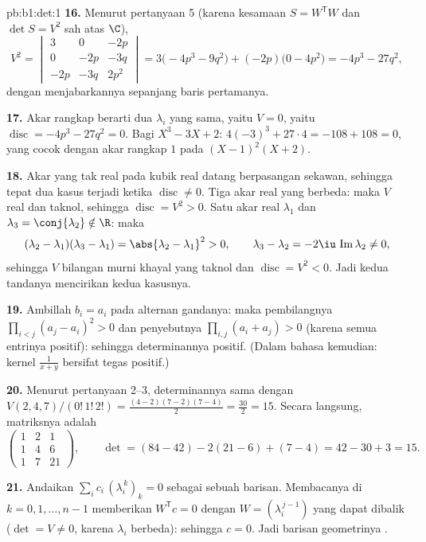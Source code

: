 \begin{solution}{pb:b1:det:1}
\textbf{16.} Menurut pertanyaan 5 (karena kesamaan $S = W^{\mathsf T}W$
dan $\det S = V^2$ sah atas $\C$),
\[
V^2 = \begin{vmatrix}
3 & 0 & -2p\\
0 & -2p & -3q\\
-2p & -3q & 2p^2
\end{vmatrix}
= 3\bigl(-4p^3 - 9q^2\bigr) + (-2p)\bigl(0 - 4p^2\bigr)
= -4p^3 - 27q^2 ,
\]
dengan menjabarkannya sepanjang baris pertamanya.

\textbf{17.} Akar rangkap berarti dua $\lambda_i$ yang sama, yaitu
$V = 0$, yaitu $\operatorname{disc} = -4p^3 - 27q^2 = 0$. Bagi
$X^3 - 3X + 2$: $4(-3)^3 + 27\cdot4 = -108 + 108 = 0$, yang cocok dengan
akar rangkap $1$ pada $(X-1)^2(X+2)$.

\textbf{18.} Akar yang tak real pada kubik real datang berpasangan
sekawan, sehingga tepat dua kasus terjadi ketika $\operatorname{disc} \neq
0$. Tiga akar real yang berbeda: maka $V$ real dan taknol, sehingga
$\operatorname{disc} = V^2 > 0$. Satu akar real $\lambda_1$ dan
$\lambda_3 = \conj{\lambda_2} \notin \R$: maka
\[
(\lambda_2 - \lambda_1)(\lambda_3 - \lambda_1) =
\abs{\lambda_2 - \lambda_1}^2 > 0,
\qquad
\lambda_3 - \lambda_2 = -2\iu\,\operatorname{Im}\lambda_2 \neq 0,
\]
sehingga $V$ bilangan murni khayal yang taknol dan
$\operatorname{disc} = V^2 < 0$. Jadi kedua tandanya mencirikan
kedua kasusnya.

\textbf{19.} Ambillah $b_i = a_i$ pada alternan gandanya: maka
pembilangnya $\prod_{i<j}(a_j - a_i)^2 > 0$ dan penyebutnya
$\prod_{i,j}(a_i + a_j) > 0$ (karena semua entrinya positif): sehingga
determinannya positif. (Dalam bahasa kemudian: kernel
$\frac1{x+y}$ bersifat tegas positif.)

\textbf{20.} Menurut pertanyaan 2--3, determinannya sama dengan
$V(2,4,7)/(0!\,1!\,2!) = \frac{(4-2)(7-2)(7-4)}{2} =
\frac{30}{2} = 15$. Secara langsung, matriksnya adalah
\[
\begin{pmatrix}
1 & 2 & 1\\
1 & 4 & 6\\
1 & 7 & 21
\end{pmatrix},
\qquad
\det = (84 - 42) - 2(21 - 6) + (7 - 4) = 42 - 30 + 3 = 15 .
\]

\textbf{21.} Andaikan $\sum_i c_i\,(\lambda_i^{\,k})_{k} = 0$ sebagai
sebuah barisan. Membacanya di $k = 0, 1, \dots, n-1$ memberikan $W^{\mathsf
T}c = 0$ dengan $W = (\lambda_i^{\,j-1})$ yang dapat dibalik ($\det = V
\neq 0$, karena $\lambda_i$ berbeda): sehingga $c = 0$. Jadi barisan geometrinya
.


\end{solution}
